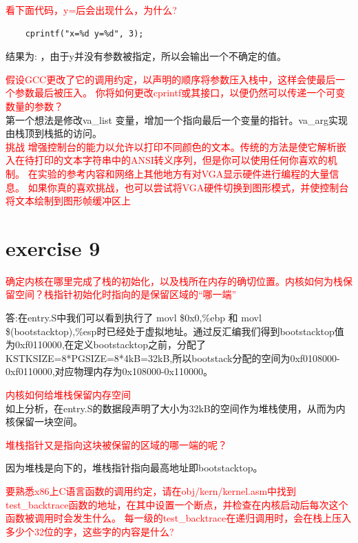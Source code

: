 \documentclass[]{ctexrep}
\begin{document}
	\textcolor{red}{看下面代码，y=后会出现什么，为什么?}
	\begin{lstlisting}
    cprintf("x=%d y=%d", 3);
	\end{lstlisting}
	结果为: ，由于y并没有参数被指定，所以会输出一个不确定的值。
	
	\textcolor{red}{假设GCC更改了它的调用约定，以声明的顺序将参数压入栈中，这样会使最后一个参数最后被压入。 你将如何更改cprintf或其接口，以便仍然可以传递一个可变数量的参数？}\\
	第一个想法是修改va\_list 变量，增加一个指向最后一个变量的指针。va\_arg实现由栈顶到栈抵的访问。\\
	
	
	\textcolor{red}{挑战 增强控制台的能力以允许以打印不同颜色的文本。传统的方法是使它解析嵌入在待打印的文本字符串中的ANSI转义序列，但是你可以使用任何你喜欢的机制。 在实验的参考内容和网络上其他地方有对VGA显示硬件进行编程的大量信息。 如果你真的喜欢挑战，也可以尝试将VGA硬件切换到图形模式，并使控制台将文本绘制到图形帧缓冲区上}
	
\section{exercise 9}
\textcolor{red}{确定内核在哪里完成了栈的初始化，以及栈所在内存的确切位置。内核如何为栈保留空间？栈指针初始化时指向的是保留区域的“哪一端”}
	
答:在entry.S中我们可以看到执行了 movl \$0x0,\%ebp 和 movl \$(bootstacktop),\%esp时已经处于虚拟地址。通过反汇编我们得到bootstacktop值为0xf0110000,在定义bootstacktop之前，分配了KSTKSIZE=8*PGSIZE=8*4kB=32kB,所以bootstack分配的空间为0xf0108000-0xf0110000,对应物理内存为0x108000-0x110000。

\textcolor{red}{内核如何给堆栈保留内存空间}\\
如上分析，在entry.S的数据段声明了大小为32kB的空间作为堆栈使用，从而为内核保留一块空间。

\textcolor{red}{堆栈指针又是指向这块被保留的区域的哪一端的呢？}

因为堆栈是向下的，堆栈指针指向最高地址即bootstacktop。

\textcolor{red}{要熟悉x86上C语言函数的调用约定，请在obj/kern/kernel.asm中找到test\_backtrace函数的地址，在其中设置一个断点，并检查在内核启动后每次这个函数被调用时会发生什么。 每一级的test\_backtrace在递归调用时，会在栈上压入多少个32位的字，这些字的内容是什么?}
\end{document}
